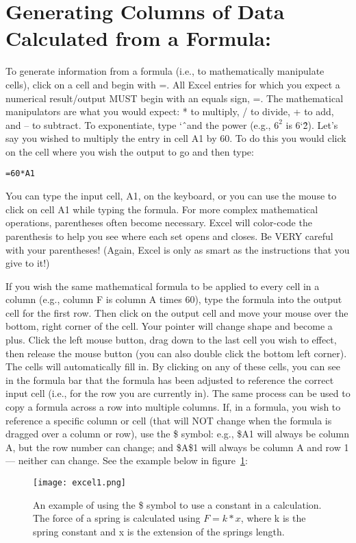 \section*{Generating Columns of Data Calculated from a Formula:}
To generate information from a formula (i.e., to mathematically manipulate cells), click on a cell and begin with =. 
All Excel entries for which you expect a numerical result/output MUST begin with an equals sign, =. 
The mathematical manipulators are what you would expect: * to multiply, / to divide, + to add, and – to subtract. 
To exponentiate, type \char`\^ \ and the power (e.g., $6^{2}$ is 6\char`\^2). 
Let's say you wished to multiply the entry in cell A1 by 60. 
To do this you would click on the cell where you wish the output to go and then type:

\medskip
\texttt{=60*A1}
\medskip

You can type the input cell, A1, on the keyboard, or you can use the mouse to click on cell A1 while typing the formula. 
For more complex mathematical operations, parentheses often become necessary. 
Excel will color-code the parenthesis to help you see where each set opens and closes. 
Be VERY careful with your parentheses!
(Again, Excel is only as smart as the instructions that you give to it!)
\par 
If you wish the same mathematical formula to be applied to every cell in a column (e.g., column F is column A times 60), type the formula into the output cell for the first row. 
Then click on the output cell and move your mouse over the bottom, right corner of the cell. 
Your pointer will change shape and become a plus. 
Click the left mouse button, drag down to the last cell you wish to effect, then release the mouse button (you can also double click the bottom left corner). 
The cells will automatically fill in. 
By clicking on any of these cells, you can see in the formula bar that the formula has been adjusted to reference the correct input cell (i.e., for the row you are currently in). 
The same process can be used to copy a formula across a row into multiple columns. 
If, in a formula, you wish to reference a specific column or cell (that will NOT change when the formula is dragged over a column or row), use the \$ symbol: e.g., \$A1 will always be column A, but the row number can change; and \$A\$1 will always be column A and row 1 — neither can change. See the example below in figure~\ref{fig:exc1}:

\begin{figure}[ht]
\texttt{[image: excel1.png]}
\centering
\caption{An example of using the \$ symbol to use a constant in a calculation. The force of a spring is calculated using $F=k * x$, where k is the spring constant and x is the extension of the springs length.}
\label{fig:exc1}
\end{figure}

